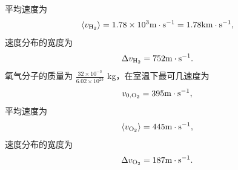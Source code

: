\documentclass{assignment}
\begin{document}
\begin{sol}
    平均速度为
    \begin{align}
        \langle v_{\ce{H2}}\rangle=1.78\times 10^3\text{m}\cdot\text{s}^{-1}=1.78\text{km}\cdot\text{s}^{-1},
    \end{align}
    速度分布的宽度为
    \begin{align}
        \Delta v_{\ce{H2}}=752\text{m}\cdot\text{s}^{-1}.
    \end{align}
    氧气分子的质量为 $\frac{32\times 10^{-3}}{6.02\times 10^{23}}$ kg，在室温下最可几速度为
    \begin{align}
        v_{0,\ce{O2}}=395\text{m}\cdot\text{s}^{-1},
    \end{align}
    平均速度为
    \begin{align}
        \langle v_{\ce{O2}}\rangle=445\text{m}\cdot\text{s}^{-1},
    \end{align}
    速度分布的宽度为
    \begin{align}
        \Delta v_{\ce{O2}}=187\text{m}\cdot\text{s}^{-1}.
    \end{align}
\end{sol}
\end{document}
